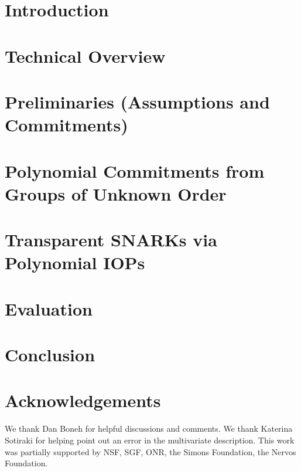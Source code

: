 \documentclass[12pt]{article}
\theoremstyle{definition}
\theoremstyle{named}
\begin{document}
\section{Introduction}
 
\section{Technical Overview}\label{sec:overview} 

\section{Preliminaries (Assumptions and Commitments)}


\section{Polynomial Commitments from Groups of Unknown Order}
\label{sec:protocol}

\section{Transparent SNARKs via Polynomial IOPs}\label{sec:polyiop}


\section{Evaluation}

\section{Conclusion}

\section*{Acknowledgements}
We thank Dan Boneh for helpful discussions and comments.
We thank Katerina Sotiraki for helping point out an error in the multivariate description.
This work was partially supported by NSF, SGF, ONR, the Simons Foundation, the Nervos Foundation. 
\pagebreak

{\footnotesize
  }

\appendix

 
\end{document}
